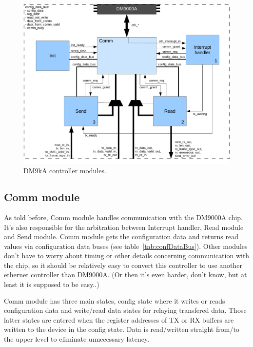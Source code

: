 \documentclass{article}
\begin{document}
\begin{figure}[htb]
  \includegraphics[scale=.5]{modules}
  \caption{DM9kA controller modules.}
  \label{fig:modules}
\end{figure}

\subsection{Comm module}

As told before, Comm module handles communication with the DM9000A
chip. It's also responsible for the arbitration between Interrupt
handler, Read module and Send module. Comm module gets the
configuration data and returns read values via configuration data
buses (see table~\ref{tab:confDataBus}). Other modules don't have to
worry about timing or other details concerning communication with the
chip, so it should be relatively easy to convert this controller to
use another ethernet controller than DM9000A. (Or then it's even
harder, don't know, but at least it is supposed to be easy..)

Comm module has three main states, config state where it writes or
reads configuration data and write/read data states for relaying
transfered data. Those latter states are entered when the register
addresses of TX or RX buffers are written to the device in the config
state. Data is read/written straight from/to the upper level to
eliminate unnecessary latency.
\end{document}
